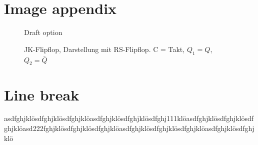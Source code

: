 \documentclass[12pt, a4paper, twopage]{scrartcl}
\begin{document}
\begin{appendix}
\setcounter{figure}{0} %
\renewcommand{\thefigure}{A\arabic{figure}} %






\section{Image appendix}


\begin{figure}[h!]
\centering
{}
  \caption{Draft option \vspace{27pt}}%
  \label{fig:jkflipflop}
\endminipage\hspace{.5cm}
%
  \caption{JK-Flipflop, Darstellung mit RS-Flipflop. C = Takt, $Q_1 = Q$, $Q_2 = \bar{Q}$}%
  \label{fig:JKmitRS}
\endminipage
\end{figure}









\section{Line break}
asdfghjklösdfghjklösdfghjklöasdfghjklösdfghjklösdfghj111klöasdfghjklösdfghjklösdfghjklöasd222\-fghjklösdfghjklösdfghjklöasdfghjklösdfghjklösdfghjklöasdfghjklösdfghjklö









\end{appendix}
\end{document}
